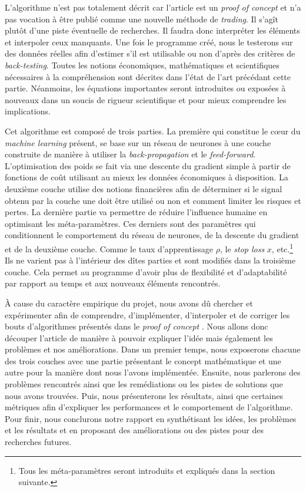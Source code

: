 \documentclass[a4paper, 11pt]{article}
\begin{document}
L'algorithme n'est pas totalement décrit car l'article
est un \textit{proof of concept} et n'a pas vocation à être publié comme une nouvelle méthode de \textit{trading}. Il s'agît plutôt d'une piste 
éventuelle de recherches. Il faudra donc
interpréter les éléments et interpoler ceux manquants. Une fois le programme créé, nous le testerons sur des données réelles afin d'estimer s'il est
utilisable ou non d'après des critères de \textit{back-testing}. Toutes les notions économiques, mathématiques et scientifiques nécessaires à la 
compréhension sont décrites dans l'état de l'art précédant cette partie. Néanmoins, les équations importantes seront introduites ou exposées à nouveaux
dans un soucis de rigueur scientifique et pour mieux comprendre les implications.

Cet algorithme est composé de trois parties. La première qui constitue le cœur du \textit{machine learning} présent, se base sur un réseau de neurones
à une couche construite de manière à utiliser la \textit{back-propagation} et le \textit{feed-forward}. L'optimisation des poids se fait via une descente du gradient simple 
à partir de fonctions de coût utilisant au mieux les données économiques à disposition. La deuxième couche utilise des notions financières afin de
déterminer si le signal obtenu par la couche une doit être utilisé ou non et comment limiter les risques et pertes. La dernière partie va permettre de
réduire l'influence humaine en optimisant les méta-paramètres. Ces derniers sont des paramètres qui conditionnent le comportement du réseau de neurones,
de la descente du gradient et de la deuxième couche. Comme le taux d'apprentissage $\rho$, le \textit{stop loss} $x$, etc.\footnote{Tous les méta-paramètres
seront introduits et expliqués dans la section suivante.} Ils ne varient pas 
à l'intérieur des dîtes parties et sont modifiés dans la troisième couche. Cela permet au programme d'avoir plus de flexibilité et d'adaptabilité par
rapport au temps et aux nouveaux éléments rencontrés.

À cause du caractère empirique du projet, nous avons dû chercher et expérimenter afin de comprendre, d'implémenter, d'interpoler et de corriger
les bouts d'algorithmes présentés dans le \textit{proof of concept} \cite{fx_trading}. Nous allons donc découper l'article de manière à pouvoir 
expliquer l'idée mais également les problèmes et nos améliorations.
Dans un premier temps, nous exposerons chacune des trois couches avec une partie présentant le concept mathématique et une autre pour la manière dont nous
l'avons implémentée. Ensuite, nous parlerons des problèmes rencontrés ainsi que les remédiations ou les pistes de solutions que nous avons trouvées.
Puis, nous présenterons les résultats, ainsi que certaines métriques afin d'expliquer les performances et le comportement de l'algorithme. Pour
finir, nous conclurons notre rapport en synthétisant les idées, les problèmes et les résultats et en proposant des améliorations ou des pistes pour 
des recherches futures.
\end{document}
